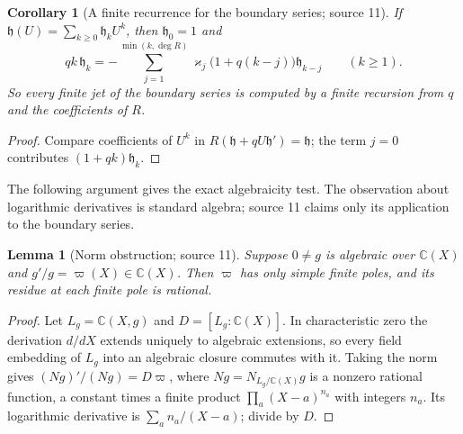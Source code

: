 \documentclass[11pt,letterpaper]{article}
\newtheorem{lemma}[lemma]{Lemma}
\newtheorem{corollary}[corollary]{Corollary}
\theoremstyle{definition}
\theoremstyle{remark}
\newcommand{\C}{\mathbb C}
\numberwithin{equation}{section}
\begin{document}
\begin{corollary}[A finite recurrence for the boundary series; source 11]
\label{dyn:rd:cor:boundaryrec}
If $\mathfrak h(U)=\sum_{k\ge0}\mathfrak h_kU^{k}$, then $\mathfrak h_0=1$ and
\begin{equation}\label{dyn:rd:eq:betarec}
 qk\,\mathfrak h_k=-\sum_{j=1}^{\min(k,\deg R)}
 \varkappa_j\bigl(1+q(k-j)\bigr)\mathfrak h_{k-j}\qquad(k\ge1).
\end{equation}
So every finite jet of the boundary series is computed by a finite recursion
from $q$ and the coefficients of $R$.
\end{corollary}
\begin{proof}
Compare coefficients of $U^{k}$ in
$R(\mathfrak h+qU\mathfrak h')=\mathfrak h$; the term $j=0$ contributes
$(1+qk)\mathfrak h_k$.
\end{proof}

The following argument gives the exact algebraicity test. The observation
about logarithmic derivatives is standard algebra; source 11 claims only its
application to the boundary series.

\begin{lemma}[Norm obstruction; source 11]\label{dyn:rd:lem:norm}
Suppose $0\ne g$ is algebraic over $\C(X)$ and $g'/g=\varpi(X)\in\C(X)$.
Then $\varpi$ has only simple finite poles, and its residue at each finite
pole is rational.
\end{lemma}
\begin{proof}
Let $L_g=\C(X,g)$ and $D=[L_g:\C(X)]$. In characteristic zero the
derivation $d/dX$ extends uniquely to algebraic extensions, so every field
embedding of $L_g$ into an algebraic closure commutes with it. Taking the
norm gives $(N g)'/(N g)=D\varpi$, where $N g=N_{L_g/\C(X)}g$ is a nonzero
rational function, a constant times a finite product $\prod_a(X-a)^{n_a}$
with integers $n_a$. Its logarithmic derivative is $\sum_an_a/(X-a)$;
divide by $D$.
\end{proof}
\end{document}
